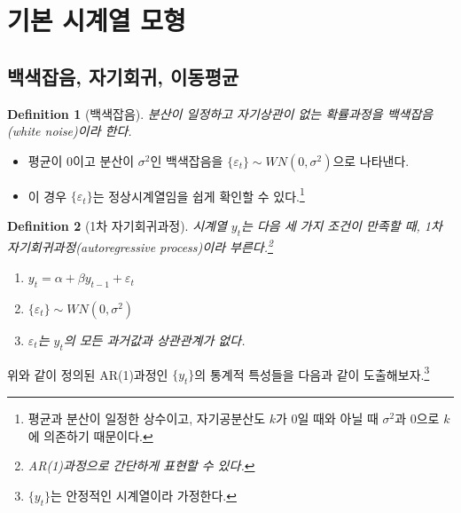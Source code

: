 \documentclass{article}
\newtheorem{defn}{Definition}
\begin{document}
\section{기본 시계열 모형}
\subsection{백색잡음, 자기회귀, 이동평균}
\begin{defn}[백색잡음]\label{def:white noise}
분산이 일정하고 자기상관이 없는 확률과정을 \emph{백색잡음}(white noise)이라 한다.  
\end{defn}
  \begin{itemize}
    \item 평균이 0이고 분산이 $\sigma^{2}$인 백색잡음을 $\{\varepsilon_{t}\} \sim WN(0, \sigma^2)$으로 나타낸다.
    \item 이 경우 $\{\varepsilon_t\}$는 정상시계열임을 쉽게 확인할 수 있다.\footnote{평균과 분산이 일정한 상수이고, 자기공분산도 $k$가 0일 때와 아닐 때 $\sigma^2$과 0으로 $k$에 의존하기 때문이다.}
  \end{itemize}
\begin{defn}[1차 자기회귀과정]\label{def:AR1}
  시계열 $y_{t}$는 다음 세 가지 조건이 만족할 때, 1차 자기회귀과정(autoregressive process)이라 부른다.\footnote{AR(1)과정으로 간단하게 표현할 수 있다.}
    \begin{enumerate}
      \item $y_{t} = \alpha + \beta y_{t-1} + \varepsilon_{t}$
      \item $\{\varepsilon_t\} \sim WN(0, \sigma^2)$
      \item $\varepsilon_t$는 $y_t$의 모든 과거값과 상관관계가 없다.
    \end{enumerate}
\end{defn}
위와 같이 정의된 AR(1)과정인 $\{y_t\}$의 통계적 특성들을 다음과 같이 도출해보자.\footnote{$\{y_t\}$는 안정적인 시계열이라 가정한다.}
\end{document}
